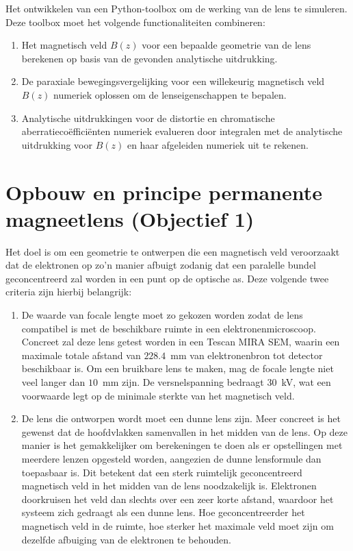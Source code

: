 \documentclass[we,twoside,openright,a4paper,11pt]{uantwerpenbamathesis}
\begin{document}
\begin{tcolorbox}[colback=red!10!white, colframe=red!40!white, sharp corners, title=Objectief 4]
    Het ontwikkelen van een Python-toolbox om de werking van de lens te simuleren. Deze toolbox moet het volgende functionaliteiten combineren:
    \begin{enumerate}
        \item Het magnetisch veld $B(z)$ voor een bepaalde geometrie van de lens berekenen op basis van de gevonden analytische uitdrukking.
        \item De paraxiale bewegingsvergelijking voor een willekeurig magnetisch veld $B(z)$ numeriek oplossen om de lenseigenschappen te bepalen.
        \item Analytische uitdrukkingen voor de distortie en chromatische aberratiecoëfficiënten numeriek evalueren door integralen met de analytische uitdrukking voor $B(z)$ en haar afgeleiden numeriek uit te rekenen.
    \end{enumerate}
\end{tcolorbox}

\section{Opbouw en principe permanente magneetlens (Objectief 1)}\label{ch:criteria}
Het doel is om een geometrie te ontwerpen die een magnetisch veld veroorzaakt dat de elektronen op zo'n manier afbuigt zodanig dat een paralelle bundel geconcentreerd zal worden in een punt op de optische as. Deze volgende twee criteria zijn hierbij belangrijk:\\

\begin{enumerate}
    \item De waarde van focale lengte moet zo gekozen worden zodat de lens compatibel is met de beschikbare ruimte in een elektronenmicroscoop. Concreet zal deze lens getest worden in een Tescan MIRA SEM, waarin een maximale totale afstand van $228.4$~mm van elektronenbron tot detector beschikbaar is. Om een bruikbare lens te maken, mag de focale lengte niet veel langer dan $10$~mm zijn. De versnelspanning bedraagt $30$~kV, wat een voorwaarde legt op de minimale sterkte van het magnetisch veld. \\

    \item De lens die ontworpen wordt moet een dunne lens zijn. Meer concreet is het gewenst dat de hoofdvlakken samenvallen in het midden van de lens. Op deze manier is het gemakkelijker om berekeningen te doen als er opstellingen met meerdere lenzen opgesteld worden, aangezien de dunne lensformule dan toepasbaar is. Dit betekent dat een sterk ruimtelijk geconcentreerd magnetisch veld in het midden van de lens noodzakelijk is. Elektronen doorkruisen het veld dan slechts over een zeer korte afstand, waardoor het systeem zich gedraagt als een dunne lens. Hoe geconcentreerder het magnetisch veld in de ruimte, hoe sterker het maximale veld moet zijn om dezelfde afbuiging van de elektronen te behouden.\\
\end{enumerate}
\end{document}
